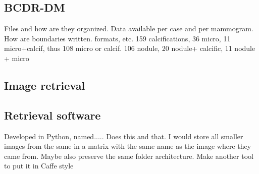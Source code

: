 \documentclass[11pt]{article}
\begin{document}
	\subsection{BCDR-DM}
	Files and how are they organized. Data available per case and per mammogram. How are boundaries written. formats, etc.
	159 calcifications, 36 micro, 11 micro+calcif, thus 108 micro or calcif. 106 nodule, 20 nodule+ calcific, 11 nodule + micro

	\subsection{Image retrieval}
	

	\subsection{Retrieval software}
Developed in Python, named..... Does this and that. I would store all smaller images from the same in a matrix with the same name as the image where they came from. Maybe also preserve the same folder architecture.
Make another tool to put it in Caffe style
\end{document}
